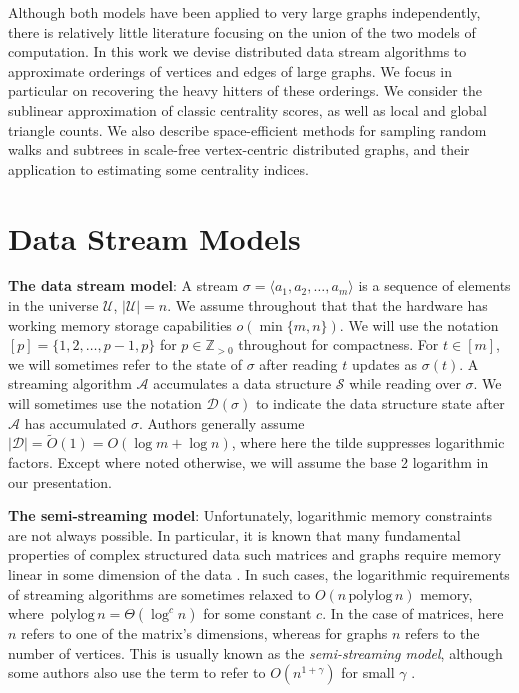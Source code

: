 \documentclass{report}
\newcommand{\polylog}{\, \mathrm{polylog} \,}
\begin{document}
Although both models have been applied to very large graphs independently, there is relatively little literature focusing on the union of the two models of computation. 
In this work we devise distributed data stream algorithms to approximate orderings of vertices and edges of large graphs. 
We focus in particular on recovering the heavy hitters of these orderings.
We consider the sublinear approximation of classic centrality scores, as well as local and global triangle counts.
We also describe space-efficient methods for sampling random walks and subtrees in scale-free vertex-centric distributed graphs, and their application to estimating some centrality indices.

\section{Data Stream Models} \label{intro:sec:data_stream}


\textbf{The data stream model}:
A stream $\sigma = \langle a_1, a_2, \dots, a_m \rangle$ is a sequence of elements in the universe $\mathcal{U}$, $|\mathcal{U}|=n$.
We assume throughout that that the hardware has working memory storage capabilities $o( \min \{m, n\})$.
We will use the notation $[p] = \{ 1, 2, \dots, p-1, p \}$ for $p \in \mathbb{Z}_{> 0}$ throughout for compactness. 
For $t \in [m]$, we will sometimes refer to the state of $\sigma$ after reading $t$ updates as $\sigma(t)$.
A streaming algorithm $\mathcal{A}$ accumulates a data structure $\mathcal{S}$ while reading over $\sigma$. 
We will sometimes use the notation $\mathcal{D}(\sigma)$ to indicate the data structure state after $\mathcal{A}$ has accumulated $\sigma$. 
Authors generally assume $|\mathcal{D}| = \widetilde{O}(1) = O(\log m + \log n)$, where here the tilde suppresses logarithmic factors.
Except where noted otherwise, we will assume the base 2 logarithm in our presentation.

\noindent
\textbf{The semi-streaming model}:
Unfortunately, logarithmic memory constraints are not always possible.
In particular, it is known that many fundamental properties of complex structured data such matrices and graphs require memory linear in some dimension of the data \cite{mahoney2011randomized, mcgregor2009graph}.
In such cases, the logarithmic requirements of streaming algorithms are sometimes relaxed to $O(n \polylog n)$ memory, where $\polylog n = \Theta(\log^c n)$ for some constant $c$. 
In the case of matrices, here $n$ refers to one of the matrix's dimensions, whereas for graphs $n$ refers to the number of vertices.
This is usually known as the \emph{semi-streaming model}, although some authors also use the term to refer to $O(n^{1+\gamma})$ for small $\gamma$ \cite{feigenbaum2005graph, muthukrishnan2005data}.
\end{document}
